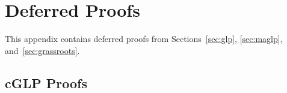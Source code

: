 \section{Deferred Proofs}\label{appendix:proofs}

This appendix contains deferred proofs from Sections~\ref{sec:glp}, \ref{sec:maglp}, and~\ref{sec:grassroots}.

\subsection{cGLP Proofs}
\label{app:glp-proofs}

\propGLPDeduction*

